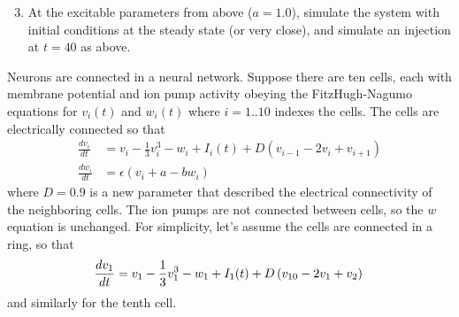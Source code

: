 \documentclass{exam}
\begin{document}
\begin{enumerate}
\setcounter{enumi}{2}
\item At the excitable parameters from above ($a=1.0$), simulate the system with initial conditions at the steady state (or very close), and simulate an injection at $t=40$ as above.
\end{enumerate}


Neurons are connected in a neural network. Suppose there are ten cells, each with membrane potential and ion pump activity obeying the FitzHugh-Nagumo equations for $v_i(t)$ and $w_i(t)$ where $i=1..10$ indexes the cells. The cells are electrically connected so that 
 \begin{align}
 \frac{d v_i}{dt} &= v_i - \frac{1}{3} v_i^3 - w_i +I_i(t) + D\left( v_{i-1} - 2 v_i + v_{i+1}\right)\\
 \frac{d w_i}{dt} &= \epsilon \left( v_i + a - bw_i\right) 
 \end{align}
where $D=0.9$ is a new parameter that described the electrical connectivity of the neighboring cells. The ion pumps are not connected between cells, so the $w$ equation is unchanged. For simplicity, let's assume the cells are connected in a ring, so that 
\begin{equation}
 \frac{d v_1}{dt} = v_1 - \frac{1}{3} v_1^3 - w_1 +I_1(t) + D\left( v_{10} - 2 v_1 + v_{2}\right)\\
\end{equation}
and similarly for the tenth cell. 
\end{document}
